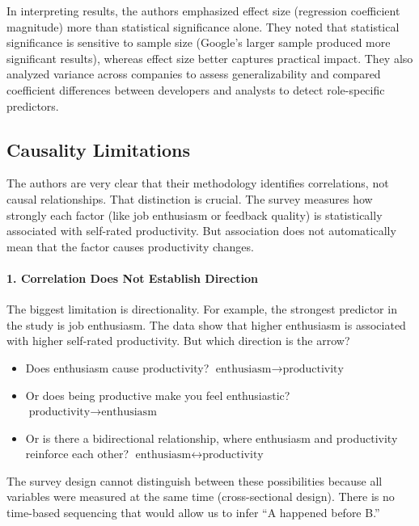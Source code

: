 In interpreting results, the authors emphasized effect size (regression coefficient magnitude) more than statistical significance alone. They noted that statistical significance is sensitive to sample size (Google’s larger sample produced more significant results), whereas effect size better captures practical impact. They also analyzed variance across companies to assess generalizability and compared coefficient differences between developers and analysts to detect role-specific predictors.

\subsection{Causality Limitations}
The authors are very clear that their methodology identifies correlations, not causal relationships. That distinction is crucial. The survey measures how strongly each factor (like job enthusiasm or feedback quality) is statistically associated with self-rated productivity. But association does not automatically mean that the factor causes productivity changes.

\paragraph{1. Correlation Does Not Establish Direction}
The biggest limitation is directionality. For example, the strongest predictor in the study is job enthusiasm. The data show that higher enthusiasm is associated with higher self-rated productivity. But which direction is the arrow?
\begin{itemize}
    \item Does enthusiasm cause productivity? $\text{enthusiasm} \rightarrow \text{productivity}$
    \item Or does being productive make you feel enthusiastic? $\text{productivity} \rightarrow \text{enthusiasm}$
    \item Or is there a bidirectional relationship, where enthusiasm and productivity reinforce each other? $\text{enthusiasm} \leftrightarrow \text{productivity}$
\end{itemize}
The survey design cannot distinguish between these possibilities because all variables were measured at the same time (cross-sectional design). There is no time-based sequencing that would allow us to infer “A happened before B.”

